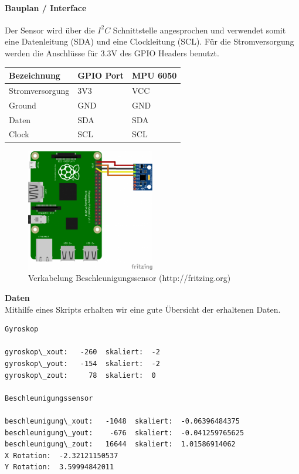 \documentclass[../../main.tex]{subfiles}
\begin{document}
\paragraph{Bauplan / Interface}
Der Sensor wird über die $I^2C$ Schnittstelle angesprochen und verwendet somit eine Datenleitung (SDA) und eine Clockleitung (SCL). Für die Stromversorgung werden die Anschlüsse für 3.3V des GPIO Headers benutzt.

\begin{table}[H]
\begin{center}
\begin{tabular}{lll}
Bezeichnung     & GPIO Port & MPU 6050 \\ \hline
Stromversorgung & 3V3      & VCC      \\ \hline
Ground          & GND      & GND      \\ \hline
Daten          & SDA      & SDA       \\ \hline
Clock          & SCL      & SCL       \\ \hline
\end{tabular}
\end{center}
\end{table}

\begin{figure}[H] \centering
  \includegraphics[width=0.5\textwidth, angle=90]{Verkabelung_BeschlSensor}
  \caption{Verkabelung Beschleunigungssensor (http://fritzing.org)}
  \label{fig:Beschleunigungssensor}
\end{figure}

\textbf{Daten}\\
Mithilfe eines Skripts erhalten wir eine gute Übersicht der erhaltenen Daten.

\begin{lstlisting}
Gyroskop

gyroskop\_xout:   -260  skaliert:  -2
gyroskop\_yout:   -154  skaliert:  -2
gyroskop\_zout:     78  skaliert:  0

Beschleunigungssensor

beschleunigung\_xout:   -1048  skaliert:  -0.06396484375
beschleunigung\_yout:    -676  skaliert:  -0.041259765625
beschleunigung\_zout:   16644  skaliert:  1.01586914062
X Rotation:  -2.32121150537
Y Rotation:  3.59994842011
\end{lstlisting}
\end{document}
